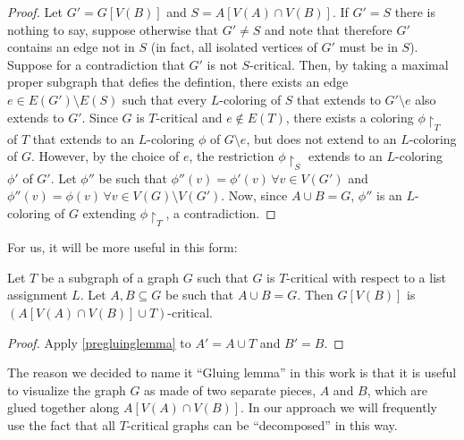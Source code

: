 \begin{proof} 
Let $G' = G[V(B)]$ and $S = A[V(A) \cap V(B)]$. If $G' = S$ there is nothing to say, suppose otherwise that $G' \neq S$ and note that therefore $G'$ contains an edge not in $S$ (in fact, all isolated vertices of $G'$ must be in $S$). Suppose for a contradiction that $G'$ is not $S$-critical. Then, by taking a maximal proper subgraph that defies the defintion, there exists an edge $e \in E(G') \setminus E(S)$ such that every $L$-coloring of $S$ that extends to $G' \setminus e$ also extends to $G'$. Since $G$ is $T$-critical and $e \not\in E(T)$, there exists a coloring $\phi\restriction_T$ of $T$ that extends to an $L$-coloring $\phi$ of $G \setminus e$, but does not extend to an $L$-coloring of $G$. However, by the choice of $e$, the restriction $\phi\restriction_S$ extends to an $L$-coloring $\phi'$ of $G'$. Let $\phi''$ be such that $\phi''(v) = \phi'(v) \, \forall v \in V(G')$ and $\phi''(v) = \phi(v) \, \forall v \in V(G) \setminus V(G')$. Now, since $A \cup B = G$, $\phi''$ is an $L$-coloring of $G$ extending $\phi\restriction_T$, a contradiction.
\end{proof}

For us, it will be more useful in this form: 

\begin{lemma}
\label{gluinglemma}
Let $T$ be a subgraph of a graph $G$ such that $G$ is $T$-critical with respect to a list assignment $L$. Let $A, B \subseteq G$ be such that $A \cup B = G$. Then $G[V(B)]$ is $(A[V(A) \cap V(B)] \cup T)$-critical.
\end{lemma}

\begin{proof} 
Apply \ref{pregluinglemma} to $A' = A \cup T$ and $B' = B$. 
\end{proof}


The reason we decided to name it ``Gluing lemma'' in this work is that it is useful to visualize the graph $G$ as made of two separate pieces, $A$ and $B$, which are glued together along $A[V(A) \cap V(B)]$. In our approach we will frequently use the fact that all $T$-critical graphs can be ``decomposed'' in this way. 



